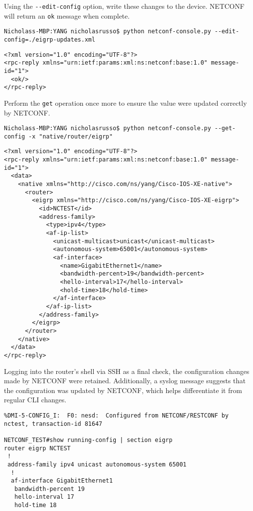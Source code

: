 Using the \verb|--edit-config| option, write these changes to the device. NETCONF
will return an \verb|ok| message when complete.

\begin{verbatim}
Nicholass-MBP:YANG nicholasrusso$ python netconf-console.py --edit-config=./eigrp-updates.xml
\end{verbatim}

\begin{verbatim}
<?xml version="1.0" encoding="UTF-8"?>
<rpc-reply xmlns="urn:ietf:params:xml:ns:netconf:base:1.0" message-id="1">
  <ok/>
</rpc-reply>
\end{verbatim}

Perform the \verb|get| operation once more to ensure the value were updated correctly by NETCONF.
 
\begin{verbatim}
Nicholass-MBP:YANG nicholasrusso$ python netconf-console.py --get-config -x "native/router/eigrp"
\end{verbatim}

\begin{verbatim}
<?xml version="1.0" encoding="UTF-8"?>
<rpc-reply xmlns="urn:ietf:params:xml:ns:netconf:base:1.0" message-id="1">
  <data>
    <native xmlns="http://cisco.com/ns/yang/Cisco-IOS-XE-native">
      <router>
        <eigrp xmlns="http://cisco.com/ns/yang/Cisco-IOS-XE-eigrp">
          <id>NCTEST</id>
          <address-family>
            <type>ipv4</type>
            <af-ip-list>
              <unicast-multicast>unicast</unicast-multicast>
              <autonomous-system>65001</autonomous-system>
              <af-interface>
                <name>GigabitEthernet1</name>
                <bandwidth-percent>19</bandwidth-percent>
                <hello-interval>17</hello-interval>
                <hold-time>18</hold-time>
              </af-interface>
            </af-ip-list>
          </address-family>
        </eigrp>
      </router>
    </native>
  </data>
</rpc-reply>
\end{verbatim}

Logging into the router's shell via SSH as a final check, the configuration
changes made by NETCONF were retained. Additionally, a syslog message suggests
that the configuration was updated by NETCONF, which helps differentiate it
from regular CLI changes.

\begin{verbatim}
%DMI-5-CONFIG_I:  F0: nesd:  Configured from NETCONF/RESTCONF by nctest, transaction-id 81647

NETCONF_TEST#show running-config | section eigrp
router eigrp NCTEST
 !
 address-family ipv4 unicast autonomous-system 65001
  !
  af-interface GigabitEthernet1
   bandwidth-percent 19
   hello-interval 17
   hold-time 18
\end{verbatim}

